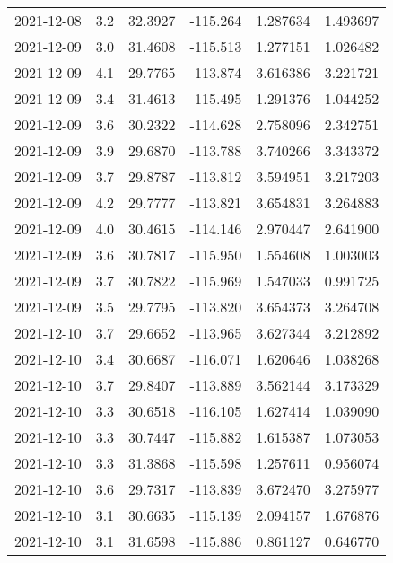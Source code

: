 \begin{tabular}{lrrrrr}
2021-12-08 &       3.2 &  32.3927 &  -115.264 &         1.287634 &         1.493697 \\
2021-12-09 &       3.0 &  31.4608 &  -115.513 &         1.277151 &         1.026482 \\
2021-12-09 &       4.1 &  29.7765 &  -113.874 &         3.616386 &         3.221721 \\
2021-12-09 &       3.4 &  31.4613 &  -115.495 &         1.291376 &         1.044252 \\
2021-12-09 &       3.6 &  30.2322 &  -114.628 &         2.758096 &         2.342751 \\
2021-12-09 &       3.9 &  29.6870 &  -113.788 &         3.740266 &         3.343372 \\
2021-12-09 &       3.7 &  29.8787 &  -113.812 &         3.594951 &         3.217203 \\
2021-12-09 &       4.2 &  29.7777 &  -113.821 &         3.654831 &         3.264883 \\
2021-12-09 &       4.0 &  30.4615 &  -114.146 &         2.970447 &         2.641900 \\
2021-12-09 &       3.6 &  30.7817 &  -115.950 &         1.554608 &         1.003003 \\
2021-12-09 &       3.7 &  30.7822 &  -115.969 &         1.547033 &         0.991725 \\
2021-12-09 &       3.5 &  29.7795 &  -113.820 &         3.654373 &         3.264708 \\
2021-12-10 &       3.7 &  29.6652 &  -113.965 &         3.627344 &         3.212892 \\
2021-12-10 &       3.4 &  30.6687 &  -116.071 &         1.620646 &         1.038268 \\
2021-12-10 &       3.7 &  29.8407 &  -113.889 &         3.562144 &         3.173329 \\
2021-12-10 &       3.3 &  30.6518 &  -116.105 &         1.627414 &         1.039090 \\
2021-12-10 &       3.3 &  30.7447 &  -115.882 &         1.615387 &         1.073053 \\
2021-12-10 &       3.3 &  31.3868 &  -115.598 &         1.257611 &         0.956074 \\
2021-12-10 &       3.6 &  29.7317 &  -113.839 &         3.672470 &         3.275977 \\
2021-12-10 &       3.1 &  30.6635 &  -115.139 &         2.094157 &         1.676876 \\
2021-12-10 &       3.1 &  31.6598 &  -115.886 &         0.861127 &         0.646770 \\

\end{tabular}
